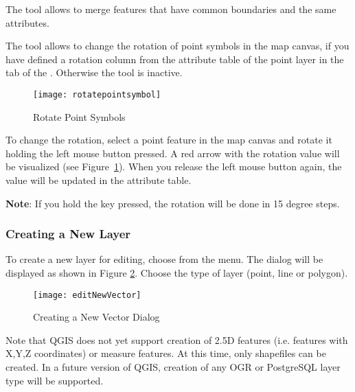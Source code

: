 The  tool allows to
merge features that have common boundaries and the same attributes.  


The  tool 
allows to change the rotation of point symbols in the map canvas, if 
you have defined a rotation column from the attribute table of the point 
layer in the  tab of the . 
Otherwise the tool is inactive.

\begin{figure}[ht]
   \begin{center}
   \caption{Rotate Point Symbols \nixcaption}\label{fig:rotatepoint}\smallskip
   \texttt{[image: rotatepointsymbol]}
\end{center}
\end{figure}

To change the rotation, select a point feature in the map canvas and rotate 
it holding the left mouse button pressed. A red arrow with the rotation value 
will be visualized (see Figure~\ref{fig:rotatepoint}). When you release the 
left mouse button again, the value will be updated in the attribute table. 

\textbf{Note}: If you hold the  key pressed, the rotation will be done 
in 15 degree steps.

\subsubsection{Creating a New Layer}\label{sec:create shape}

To create a new layer for editing, choose  from the
 menu. 
The  dialog will be displayed as
shown in Figure \ref{fig:newvectorlayer}. Choose the type of layer (point,
line or polygon).

\begin{figure}[ht]
   \begin{center}
   \caption{Creating a New Vector Dialog \nixcaption}\label{fig:newvectorlayer}\smallskip
   \texttt{[image: editNewVector]}
\end{center} 
\end{figure}

Note that QGIS does not yet support creation of 2.5D
features (i.e. features with X,Y,Z coordinates) or measure features. At this
time, only shapefiles can be created. In a future version of QGIS, creation of
any OGR or PostgreSQL layer type will be supported. 

